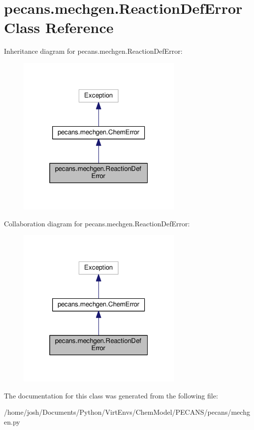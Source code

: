 \hypertarget{classpecans_1_1mechgen_1_1ReactionDefError}{}\section{pecans.\+mechgen.\+Reaction\+Def\+Error Class Reference}
\label{classpecans_1_1mechgen_1_1ReactionDefError}


Inheritance diagram for pecans.\+mechgen.\+Reaction\+Def\+Error\+:\nopagebreak
\begin{figure}[H]
\begin{center}
\leavevmode
\includegraphics[width=229pt]{classpecans_1_1mechgen_1_1ReactionDefError__inherit__graph}
\end{center}
\end{figure}


Collaboration diagram for pecans.\+mechgen.\+Reaction\+Def\+Error\+:\nopagebreak
\begin{figure}[H]
\begin{center}
\leavevmode
\includegraphics[width=229pt]{classpecans_1_1mechgen_1_1ReactionDefError__coll__graph}
\end{center}
\end{figure}


The documentation for this class was generated from the following file\+:\begin{DoxyCompactItemize}
\item 
/home/josh/\+Documents/\+Python/\+Virt\+Envs/\+Chem\+Model/\+P\+E\+C\+A\+N\+S/pecans/mechgen.\+py\end{DoxyCompactItemize}
